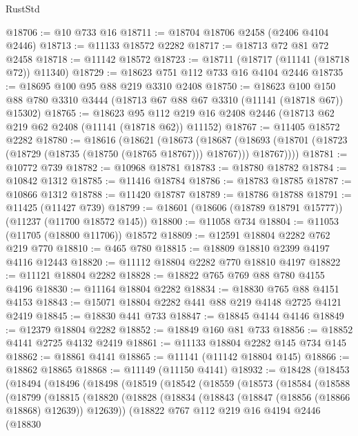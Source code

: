 \begin{lexlean}{RustStd}
\begin{coremodule}
@18706 := @10 @733 @16
@18711 := @18704 @18706 @2458 (@2406 @4104 @2446)
@18713 := @11133 @18572 @2282
@18717 := @18713 @72 @81 @72 @2458
@18718 := @11142 @18572
@18723 := @18711 (@18717 (@11141 (@18718 @72)) @11340)
@18729 := @18623 @751 @112 @733 @16 @4104 @2446
@18735 := @18695 @100 @95 @88 @219 @3310 @2408
@18750 := @18623
    @100
    @150
    @88
    @780
    @3310
    @3444
    (@18713 @67 @88 @67 @3310 (@11141 (@18718 @67)) @15302)
@18765 := @18623
    @95
    @112
    @219
    @16
    @2408
    @2446
    (@18713 @62 @219 @62 @2408 (@11141 (@18718 @62)) @11152)
@18767 := @11405 @18572 @2282
@18780 := @18616
    (@18621
      (@18673
        (@18687
          (@18693 (@18701 (@18723 (@18729 (@18735 (@18750 (@18765 @18767))) @18767))) @18767))))
@18781 := @10772 @739
@18782 := @10968 @18781
@18783 := @18780 @18782
@18784 := @10842 @1312
@18785 := @11416 @18784
@18786 := @18783 @18785
@18787 := @10866 @1312
@18788 := @11420 @18787
@18789 := @18786 @18788
@18791 := @11425 (@11427 @739)
@18799 := @18601 (@18606 (@18789 @18791 @15777)) (@11237 (@11700 @18572 @145))
@18800 := @11058 @734
@18804 := @11053 (@11705 (@18800 @11706)) @18572
@18809 := @12591 @18804 @2282 @762 @219 @770
@18810 := @465 @780
@18815 := @18809 @18810 @2399 @4197 @4116 @12443
@18820 := @11112 @18804 @2282 @770 @18810 @4197
@18822 := @11121 @18804 @2282
@18828 := @18822 @765 @769 @88 @780 @4155 @4196
@18830 := @11164 @18804 @2282
@18834 := @18830 @765 @88 @4151 @4153
@18843 := @15071 @18804 @2282 @441 @88 @219 @4148 @2725 @4121 @2419
@18845 := @18830 @441 @733
@18847 := @18845 @4144 @4146
@18849 := @12379 @18804 @2282
@18852 := @18849 @160 @81 @733
@18856 := @18852 @4141 @2725 @4132 @2419
@18861 := @11133 @18804 @2282 @145 @734 @145
@18862 := @18861 @4141
@18865 := @11141 (@11142 @18804 @145)
@18866 := @18862 @18865
@18868 := @11149 (@11150 @4141)
@18932 := @18428
    (@18453
      (@18494
        (@18496
          (@18498
            (@18519
              (@18542
                (@18559
                  (@18573
                    (@18584
                      (@18588
                        (@18799
                          (@18815
                            (@18820
                              (@18828
                                (@18834 (@18843 (@18847 (@18856 (@18866 @18868) @12639)) @12639))
                                (@18822
                                  @767
                                  @112
                                  @219
                                  @16
                                  @4194
                                  @2446
                                  (@18830

\end{coremodule}
\end{lexlean}
